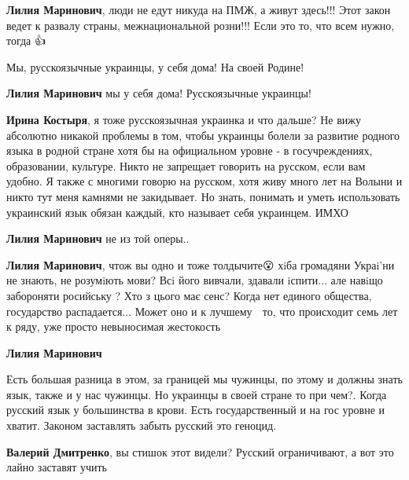 \begin{itemize}
\begin{itemize}
\textbf{Лилия Маринович}, люди не едут никуда на ПМЖ, а живут здесь!!! Этот
закон ведет к развалу страны, межнациональной розни!!! Если это то, что всем
нужно, тогда 👍

Мы, русскоязычные украинцы, у себя дома! На своей Родине!

\textbf{Лилия Маринович} мы у себя дома! Русскоязычные украинцы!

\textbf{Ирина Костыря}, я тоже русскоязычная украинка и что дальше? Не вижу
абсолютно никакой проблемы в том, чтобы украинцы болели за развитие родного
языка в родной стране хотя бы на официальном уровне - в госучреждениях,
образовании, культуре. Никто не запрещает говорить на русском, если вам удобно.
Я также с многими говорю на русском, хотя живу много лет на Волыни и никто тут
меня камнями не закидывает. Но знать, понимать и уметь использовать украинский
язык обязан каждый, кто называет себя украинцем. ИМХО

\textbf{Лилия Маринович} не из той оперы..

\textbf{Лилия Маринович}, чтож вы одно и тоже толдычите😮 хiба громадяни
Украi'ни не знають, не розумiють мови? Всi його вивчали, здавали iспити... але
навiщо забороняти росийську ? Хто з цього має сенс? Когда нет единого общества,
государство распадается... Может оно и к лучшему 🤔 то, что происходит семь лет
к ряду, уже просто невыносимая жестокость 🤮

\textbf{Лилия Маринович}

Есть большая разница в этом, за границей мы чужинцы, по этому и должны знать язык, также и у нас чужинцы.
Но украинцы в своей стране то при чем?. Когда русский язык у большинства в крови.
Есть государственный и на гос уровне и хватит.
Законом заставлять забыть русский это геноцид.

\textbf{Валерий Дмитренко}, вы стишок этот видели? Русский ограничивают, а вот
это лайно заставят учить 🤮


\end{itemize}
\end{itemize}
